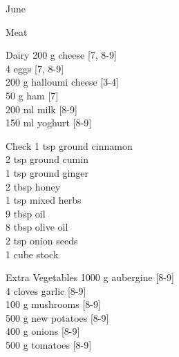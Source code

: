 \begin{menu}{June}
\begin{shoppinglist}{Meat}
      \end{shoppinglist}%
      \begin{shoppinglist}{Dairy}
      200 g cheese {\scriptsize[7, 8-9]}\\
      4  eggs {\scriptsize[7, 8-9]}\\
      200 g halloumi cheese {\scriptsize[3-4]}\\
      50 g ham {\scriptsize[7]}\\
      200 ml milk {\scriptsize[8-9]}\\
      150 ml yoghurt {\scriptsize[8-9]}\\
      \end{shoppinglist}%
      \par\vfil %
      \vfil\clearpage %
      \begin{shoppinglist}{Check}
      1 tsp ground cinnamon \\
      2 tsp ground cumin \\
      1 tsp ground ginger \\
      2 tbsp honey \\
      1 tsp mixed herbs \\
      9 tbsp oil \\
      8 tbsp olive oil \\
      2 tsp onion seeds \\
      1 cube stock \\
      \end{shoppinglist}%
      \begin{shoppinglist}{Extra Vegetables}
      1000 g aubergine {\scriptsize[8-9]}\\
      4 cloves garlic {\scriptsize[8-9]}\\
      100 g mushrooms {\scriptsize[8-9]}\\
      500 g new potatoes {\scriptsize[8-9]}\\
      400 g onions {\scriptsize[8-9]}\\
      500 g tomatoes {\scriptsize[8-9]}\\
      \end{shoppinglist}%
      \par\vfil %
    \vfil\clearpage
  

\end{menu}
